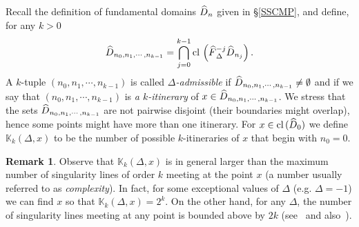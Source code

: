 \documentclass[10pt]{amsart}
\theoremstyle{definition}\newtheorem{defi}[theo]{Definition}\newtheorem{rema}[theo]{Remark}\newtheorem{exam}[theo]{Example}\newtheorem{exem}[theo]{Example}\newtheorem{nota}[theo]{Notation}
\newcommand{\cl}[1]{\mathrm{cl}\,#1}
\newcommand{\LC}{\mathbb{K}}
\newcommand{\hDom}{\hat D}
\newcommand{\nf}{\hat F}
\let\oldhat\hat
\renewcommand*{\hat}[1]{\mathchoice{\widehat{#1}}{\widehat{#1}}{\oldhat{#1}}{\oldhat{#1}}}
\begin{document}
Recall the definition of fundamental domains $\hDom_n$ given in
\S\ref{SSCMP}, and define, for any $k > 0$
\begin{equation}\label{DefItin}
\hDom_{n_0,n_1,\cdots,n_{k-1}} = \bigcap_{j = 0}^{k-1}\cl\left(\nf^{-j}_{\Delta}\hDom_{n_j}\right).
\end{equation}
A $k$-tuple $(n_0,n_1,\cdots,n_{k-1})$ is called
\emph{$\Delta$-admissible} if $\hDom_{n_0,n_1,\cdots,n_{k-1}}\ne\emptyset$ and if we say that $(n_0,n_1,\cdots,n_{k-1})$ is \emph{a $k$-itinerary} of $x\in\hDom_{n_0,n_1,\cdots,n_{k-1}}$. We stress that the sets $\hDom_{n_0,n_1,\cdots,n_{k-1}}$ are not pairwise disjoint (their boundaries might overlap), hence some points might have more than one itinerary. For $x\in \cl(\hDom_0)$ we define $ \LC_k(\Delta,x)$ to be the number of possible $k$-itineraries of $x$ that begin with $n_0=0$.
\begin{rema}
Observe that $\LC_k(\Delta,x)$ is in general larger than the maximum number of singularity lines of order $k$ meeting at the point $x$ (a number usually referred to as \emph{complexity}). In fact, for some exceptional values of $\Delta$ (e.g. $\Delta = -1$) we can find $x$ so that $\LC_k(\Delta,x) = 2^k$. On the other hand, for any $\Delta$, the number of singularity lines meeting at any point is bounded above by $2k$ (see~\cite[Proof of Theorem~2]{fum} and also~\cite{C3}).
\end{rema}
\end{document}
